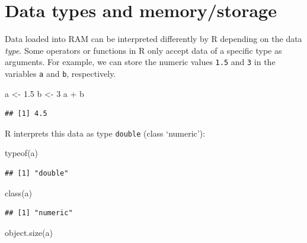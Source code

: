 \documentclass[
  12pt,
]{style/krantz}
\newenvironment{Shaded}{\begin{snugshade}}{\end{snugshade}}
\newcommand{\DecValTok}[1]{\textcolor[rgb]{0.00,0.00,0.81}{#1}}
\newcommand{\FloatTok}[1]{\textcolor[rgb]{0.00,0.00,0.81}{#1}}
\newcommand{\FunctionTok}[1]{\textcolor[rgb]{0.00,0.00,0.00}{#1}}
\newcommand{\NormalTok}[1]{#1}
\newcommand{\OtherTok}[1]{\textcolor[rgb]{0.56,0.35,0.01}{#1}}
\newcommand{\SpecialCharTok}[1]{\textcolor[rgb]{0.00,0.00,0.00}{#1}}
\begin{document}
\hypertarget{data-types-and-memorystorage}{%
\section{Data types and memory/storage}\label{data-types-and-memorystorage}}

Data loaded into RAM can be interpreted differently by R depending on the data \emph{type}. Some operators or functions in R only accept data of a specific type as arguments. For example, we can store the numeric values \texttt{1.5} and \texttt{3} in the variables \texttt{a} and \texttt{b}, respectively.

\begin{Shaded}
\begin{Highlighting}[]
\NormalTok{a }\OtherTok{\textless{}{-}} \FloatTok{1.5}
\NormalTok{b }\OtherTok{\textless{}{-}} \DecValTok{3}
\NormalTok{a }\SpecialCharTok{+}\NormalTok{ b}
\end{Highlighting}
\end{Shaded}

\begin{verbatim}
## [1] 4.5
\end{verbatim}

R interprets this data as type \texttt{double} (class `numeric'):

\begin{Shaded}
\begin{Highlighting}[]
\FunctionTok{typeof}\NormalTok{(a)}
\end{Highlighting}
\end{Shaded}

\begin{verbatim}
## [1] "double"
\end{verbatim}

\begin{Shaded}
\begin{Highlighting}[]
\FunctionTok{class}\NormalTok{(a)}
\end{Highlighting}
\end{Shaded}

\begin{verbatim}
## [1] "numeric"
\end{verbatim}

\begin{Shaded}
\begin{Highlighting}[]
\FunctionTok{object.size}\NormalTok{(a)}
\end{Highlighting}
\end{Shaded}
\end{document}
